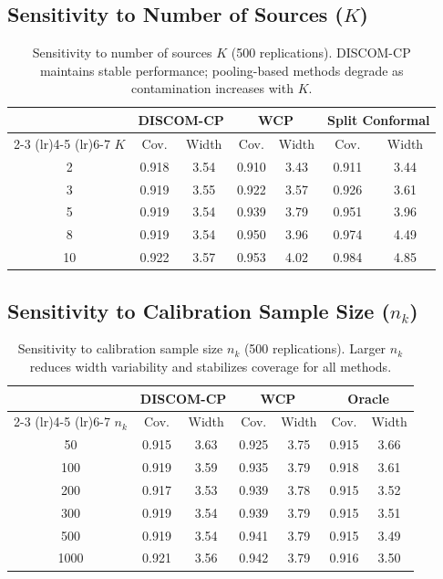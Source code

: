 \documentclass{article}
\newcommand{\DISCOM}{\textsc{DISCOM-CP}}
\begin{document}
\subsection*{Sensitivity to Number of Sources ($K$)}

\begin{table}[h]
\caption{Sensitivity to number of sources $K$ (500 replications). \DISCOM{} maintains stable performance; pooling-based methods degrade as contamination increases with $K$.}
\label{tab:sensitivity_K}
\centering
\small
\begin{tabular}{ccccccc}
\toprule
& \multicolumn{2}{c}{\textbf{\DISCOM{}}} & \multicolumn{2}{c}{\textbf{WCP}} & \multicolumn{2}{c}{\textbf{Split Conformal}} \\
\cmidrule(lr){2-3} \cmidrule(lr){4-5} \cmidrule(lr){6-7}
$K$ & Cov. & Width & Cov. & Width & Cov. & Width \\
\midrule
2 & 0.918 & 3.54 & 0.910 & 3.43 & 0.911 & 3.44 \\
3 & 0.919 & 3.55 & 0.922 & 3.57 & 0.926 & 3.61 \\
5 & 0.919 & 3.54 & 0.939 & 3.79 & 0.951 & 3.96 \\
8 & 0.919 & 3.54 & 0.950 & 3.96 & 0.974 & 4.49 \\
10 & 0.922 & 3.57 & 0.953 & 4.02 & 0.984 & 4.85 \\
\bottomrule
\end{tabular}
\end{table}

\subsection*{Sensitivity to Calibration Sample Size ($n_k$)}

\begin{table}[h]
\caption{Sensitivity to calibration sample size $n_k$ (500 replications). Larger $n_k$ reduces width variability and stabilizes coverage for all methods.}
\label{tab:sensitivity_nk}
\centering
\small
\begin{tabular}{ccccccc}
\toprule
& \multicolumn{2}{c}{\textbf{\DISCOM{}}} & \multicolumn{2}{c}{\textbf{WCP}} & \multicolumn{2}{c}{\textbf{Oracle}} \\
\cmidrule(lr){2-3} \cmidrule(lr){4-5} \cmidrule(lr){6-7}
$n_k$ & Cov. & Width & Cov. & Width & Cov. & Width \\
\midrule
50 & 0.915 & 3.63 & 0.925 & 3.75 & 0.915 & 3.66 \\
100 & 0.919 & 3.59 & 0.935 & 3.79 & 0.918 & 3.61 \\
200 & 0.917 & 3.53 & 0.939 & 3.78 & 0.915 & 3.52 \\
300 & 0.919 & 3.54 & 0.939 & 3.79 & 0.915 & 3.51 \\
500 & 0.919 & 3.54 & 0.941 & 3.79 & 0.915 & 3.49 \\
1000 & 0.921 & 3.56 & 0.942 & 3.79 & 0.916 & 3.50 \\
\bottomrule
\end{tabular}
\end{table}
\end{document}
